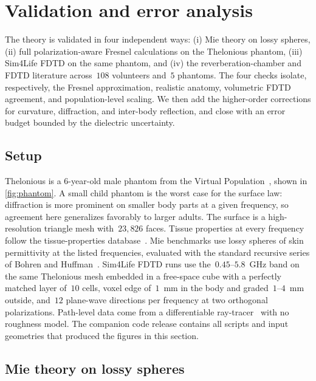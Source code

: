 \documentclass[journal,twocolumn,10pt]{IEEEtran}
\theoremstyle{plain}
\begin{document}
\section{Validation and error analysis}\label{sec:val}

The theory is validated in four independent ways: (i) Mie theory on
lossy spheres, (ii) full polarization-aware Fresnel calculations on
the Thelonious phantom, (iii) Sim4Life FDTD on the same phantom, and
(iv) the reverberation-chamber and FDTD literature across~$108$
volunteers and~$5$ phantoms. The four checks isolate, respectively, the
Fresnel approximation, realistic anatomy, volumetric FDTD agreement,
and population-level scaling. We then add the higher-order corrections
for curvature, diffraction, and inter-body reflection, and close with an
error budget bounded by the dielectric uncertainty.

\subsection{Setup}\label{subsec:val-setup}

Thelonious is a 6-year-old male phantom from the Virtual
Population~\cite{ITISv5}, shown in \cref{fig:phantom}. A small child
phantom is the worst case for the surface law: diffraction is more
prominent on smaller body parts at a given frequency, so agreement
here generalizes favorably to larger adults. The surface is
a high-resolution triangle mesh with~$23{,}826$ faces. Tissue
properties at every frequency follow the tissue-properties
database~\cite{ITISv5,Gabriel1996}. Mie
benchmarks use lossy spheres of skin permittivity at the listed
frequencies, evaluated with the standard recursive series of Bohren
and Huffman~\cite{BohrenHuffman1983}. Sim4Life FDTD runs use the~$0.45$--$5.8$~GHz band on the same
Thelonious mesh embedded in a free-space cube with a perfectly matched
layer of~$10$ cells, voxel edge of~$1$~mm in the body and
graded~$1$--$4$~mm outside, and~$12$ plane-wave directions per
frequency at two orthogonal polarizations. Path-level data come from a
differentiable ray-tracer~\cite{SionnaRT} with no roughness model. The
companion code release contains all scripts and input geometries that
produced the figures in this section.

\subsection{Mie theory on lossy spheres}\label{subsec:val-mie}
\end{document}
